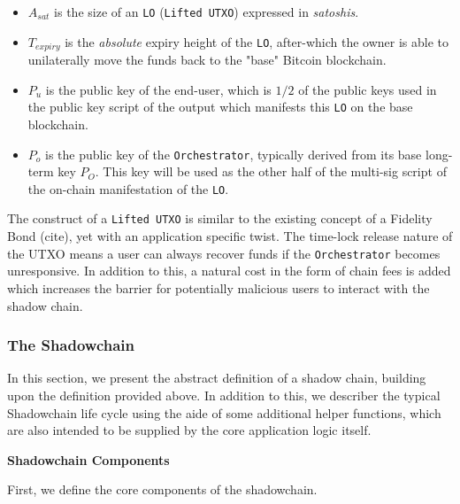 \documentclass[12pt,a4paper]{article}
\theoremstyle{definition}
\begin{document}
\begin{itemize}
    \item $A_{sat}$ is the size of an \texttt{LO} (\texttt{Lifted UTXO})
        expressed in \emph{satoshis}.

    \item $T_{expiry}$ is the \emph{absolute} expiry height of the \texttt{LO},
        after-which the owner is able to unilaterally move the funds back to
        the "base" Bitcoin blockchain.

    \item $P_{u}$ is the public key of the end-user, which is $1/2$ of the
        public keys used in the public key script of the output which manifests
        this \texttt{LO} on the base blockchain.

    \item $P_{o}$ is the public key of the \texttt{Orchestrator}, typically
        derived from its base long-term key $P_O$. This key will be used as the
        other half of the multi-sig script of the on-chain manifestation of the
        \texttt{LO}.
\end{itemize}


The construct of a \texttt{Lifted UTXO} is similar to the existing concept of a
Fidelity Bond (cite), yet with an application specific twist. The time-lock
release nature of the UTXO means a user can always recover funds if the
\texttt{Orchestrator} becomes unresponsive. In addition to this, a natural cost
in the form of chain fees is added which increases the barrier for potentially
malicious users to interact with the shadow chain.

\subsubsection{The Shadowchain}

In this section, we present the abstract definition of a shadow chain, building
upon the definition provided above. In addition to this, we describer the
typical Shadowchain life cycle using the aide of some additional helper
functions, which are also intended to be supplied by the core application logic
itself.

\begin{center}
    \textbf{Shadowchain Components}
\end{center}

First, we define the core components of the shadowchain. 
\end{document}
